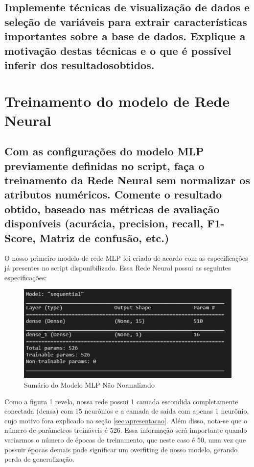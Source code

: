 \documentclass[12pt]{article}
\begin{document}
\subsection{Implemente técnicas de visualização de dados e seleção de variáveis para extrair características importantes sobre a base de dados. Explique	a motivação destas técnicas e o que é possível inferir dos resultadosobtidos.}


\section{Treinamento do modelo de Rede Neural}

\subsection{Com as configurações do modelo MLP previamente definidas no script, faça o treinamento da Rede Neural sem normalizar os atributos	numéricos. Comente o resultado obtido, baseado nas métricas de	avaliação disponíveis (acurácia, precision, recall, F1-Score, Matriz de	confusão, etc.)}

O nosso primeiro modelo de rede MLP foi criado de acordo com as especificações já presentes no script disponibilizado. Essa Rede Neural possui as seguintes especificações:

\begin{figure}[H]
	\centering
	\includegraphics[width=0.7\linewidth]{Imagens/SumarioModeloNaoNormalziado}
	\caption{Sumário do Modelo MLP Não Normalizado}
	\label{fig:sumariomodelonaonormalziado}
\end{figure}

Como a figura \ref{fig:sumariomodelonaonormalziado} revela, nossa rede possui 1 camada escondida completamente conectada (densa) com 15 neurônios e a camada de saída com apenas 1 neurônio, cujo motivo fora explicado na seção \ref{sec:apresentacao}. Além disso, nota-se que o número de parâmetros treináveis é 526. Essa informação será importante quando variarmos o número de épocas de treinamento, que neste caso é 50, uma vez que possuir épocas demais pode significar um overfiting de nosso modelo, gerando perda de generalização. 
\end{document}
